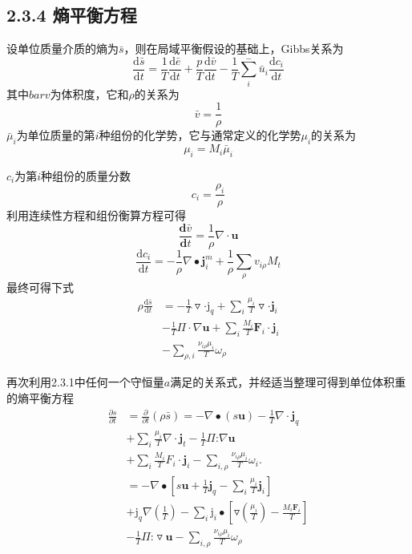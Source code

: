 \documentclass[10pt,aspectratio=43,mathserif,table]{ctexbeamer}
\begin{document}
\subsection{2.3.4 熵平衡方程}

\begin{frame}
    设单位质量介质的熵为$\bar{s}$，则在局域平衡假设的基础上，Gibbs关系为
    $$\frac{\mathrm{d}\bar{s}}{\mathrm{d}t}=\frac{1}{T}\frac{\mathrm{d}\bar{e}}{\mathrm{d}t}+\frac{p}{T}\frac{\mathrm{d}\bar{v}}{\mathrm{d}t}-\frac{1}{T}\sum_{i}^{-}\bar{u}_i\frac{\mathrm{d}c_{i}}{\mathrm{d}t}$$
    其中$bar{v}$为体积度，它和${\rho}$的关系为
    $$
    \bar{v}=\frac{1}{\rho}
    $$
    $\bar{\mu}_{i}$为单位质量的第$i$种组份的化学势，它与通常定义的化学势${\mu}_{i}$的关系为
    $$
    \mu_i=M_i\bar{\mu}_i
    $$
\end{frame}

\begin{frame}
    $c_i$为第$i$种组份的质量分数
    $$
    c_i=\frac{\rho_i}\rho 
    $$
    利用连续性方程和组份衡算方程可得
    $$
    \frac{\mathbf{d}\bar{v}}{\mathbf{d}t}=\frac1\rho\nabla\cdot\mathbf{u}
    $$
    $$
    \frac{\mathrm{d}c_i}{\mathrm{d}t}=-\frac1\rho\nabla\bullet\mathbf{j}_i^m+\frac1\rho\sum_\rho v_{i\rho}M_t
    $$
    最终可得下式
    $$
    \begin{aligned}\rho\frac{\mathrm{d}\bar{s}}{\mathrm{d}t}&=-\frac1T\triangledown\cdot\mathrm{j}_q+\sum_i\frac{\mu_i}T\triangledown\cdot\mathbf{j}_i\\&-\frac1T\Pi\cdot\nabla\mathbf{u}+\sum_i\frac{M_i}T\mathbf{F}_i\cdot\mathbf{j}_i\\&-\sum_{\rho,i}\frac{\nu_{i\rho}\mu_i}T\omega_\rho\end{aligned}
    $$
\end{frame}

\begin{frame}
    再次利用2.3.1中任何一个守恒量$a$满足的关系式，并经适当整理可得到单位体积重的熵平衡方程
    $$
    \begin{aligned}
        \frac{\partial s}{\partial t}& ={\frac{\partial}{\partial t}}(\rho\bar{s})=-\nabla\bullet(s\mathbf{u})-{\frac{1}{T}}\nabla\cdot\mathbf{j}_{q}  \\
        &+\sum_i\frac{\mu_i}T\nabla\cdot\mathbf{j}_t-\frac1T\Pi\text{:}\nabla\mathbf{u} \\
        &+\sum_i\frac{M_i}TF_i\cdot\mathbf{j}_i-\sum_{i,\rho}\frac{\nu_{i\rho}\mu_i}{T}\omega_i. \\
        &=-\nabla\bullet\left[s\mathbf{u}+\frac1T\mathbf{j}_q-\sum_i\frac{\mu_i}T\mathbf{j}_i\right] \\
        &+\mathrm{j}_q\nabla\left(\frac1T\right)-\sum_i\mathrm{j}_i\bullet\left[\triangledown\left(\frac{\mu_i}T\right)-\frac{M_i\mathbf{F}_i}T\right] \\
        &-\frac1T\Pi\text{:}\triangledown\mathbf{u}-\sum_{i,\rho}\frac{\nu_{i\rho}\mu_i}{T}\omega_{\rho}\quad\quad
    \end{aligned}
    $$
\end{frame}

\end{document}

